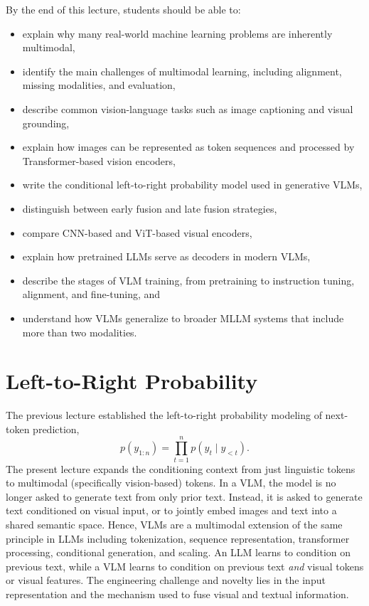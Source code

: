 \documentclass{article}
\begin{document}
By the end of this lecture, students should be able to:
\begin{itemize}
    \item explain why many real-world machine learning problems are inherently multimodal,
    \item identify the main challenges of multimodal learning, including alignment, missing modalities, and evaluation,
    \item describe common vision-language tasks such as image captioning and visual grounding,
    \item explain how images can be represented as token sequences and processed by Transformer-based vision encoders,
    \item write the conditional left-to-right probability model used in generative VLMs,
    \item distinguish between early fusion and late fusion strategies,
    \item compare CNN-based and ViT-based visual encoders,
    \item explain how pretrained LLMs serve as decoders in modern VLMs,
    \item describe the stages of VLM training, from pretraining to instruction tuning, alignment, and fine-tuning, and
    \item understand how VLMs generalize to broader MLLM systems that include more than two modalities.
\end{itemize}

\section{Left-to-Right Probability}

The previous lecture established the left-to-right probability modeling of next-token prediction,
\begin{equation}
    p(y_{1:n}) = \prod_{t=1}^{n} p(y_t \mid y_{<t}).
\end{equation}
The present lecture expands the conditioning context from just linguistic tokens to multimodal (specifically vision-based) tokens. In a VLM, the model is no longer asked to generate text from only prior text. Instead, it is asked to generate text conditioned on visual input, or to jointly embed images and text into a shared semantic space. Hence, VLMs are a multimodal extension of the same principle in LLMs including tokenization, sequence representation, transformer processing, conditional generation, and scaling. An LLM learns to condition on previous text, while a VLM learns to condition on previous text \emph{and} visual tokens or visual features. The engineering challenge and novelty lies in the input representation and the mechanism used to fuse visual and textual information.
\end{document}
